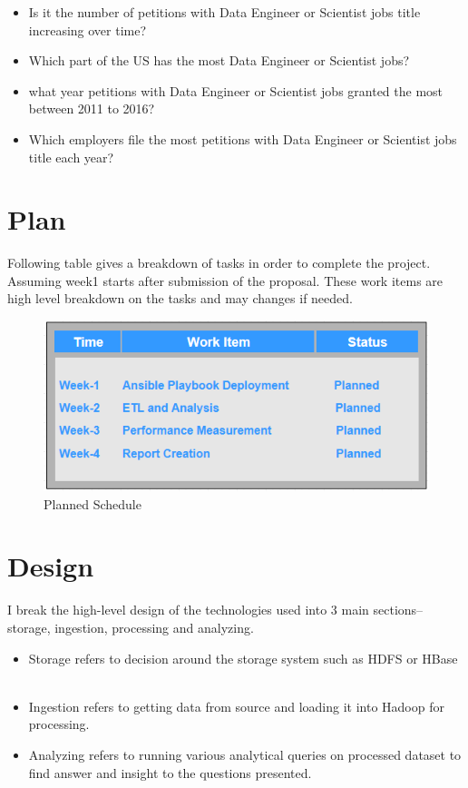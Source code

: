 \documentclass[9pt,twocolumn,twoside]{styles/osajnl}
\begin{document}
\begin{itemize}
  \item Is it the number of petitions with Data Engineer or Scientist jobs title increasing over time?
  \item Which part of the US has the most Data Engineer or Scientist  jobs?
  \item what year petitions with Data Engineer or Scientist jobs granted the most between 2011 to 2016?
  \item  Which employers file the most petitions with Data Engineer or Scientist jobs title each year?
\end{itemize}


\section{Plan}
Following table gives a breakdown of tasks in order to complete the project. Assuming week1 starts after submission of the proposal. These work items are high level breakdown on the tasks and may changes if needed.

\begin{figure}[H]
 \centering
\includegraphics[scale=0.6]{images/image11}
\caption{Planned Schedule}
\end{figure}

\section{Design}

I break the high-level design of the technologies used into 3 main sections-- storage, ingestion, processing and analyzing. 

\begin{itemize}
  \item Storage refers to decision around the storage system such as HDFS or HBase ~\cite{wiki-hadoop}
  \item Ingestion refers to getting data from source and loading it into Hadoop for processing.
  \item Analyzing refers to running various analytical queries on processed dataset to find answer and insight to the questions presented. 
\end{itemize}
\end{document}
